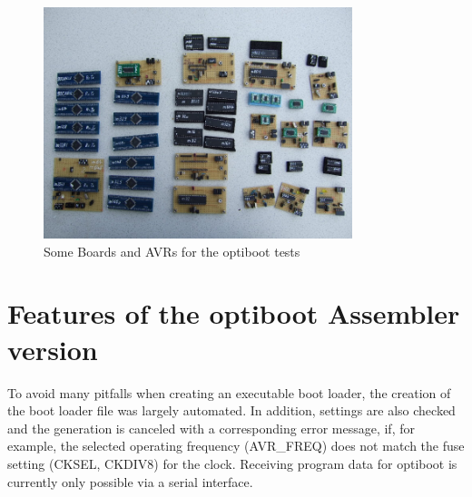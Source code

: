 \begin{figure}[H]
\centering
\includegraphics[width=9cm]{../FIG/Samples_AVR_boot.jpg}
\caption{Some Boards and AVRs for the optiboot tests}
\label{fig:PlatinesAndAVRs}
\end{figure}


\section{Features of the optiboot Assembler version}

To avoid many pitfalls when creating an executable boot loader,
the creation of the boot loader file was largely automated.
In addition, settings are also checked and the generation is
canceled with a corresponding error message,
if, for example, the selected operating frequency (AVR\_FREQ) does not match the
fuse setting (CKSEL, CKDIV8) for the clock.
Receiving program data for optiboot is currently only possible via a serial interface. \\

